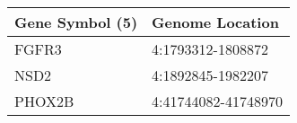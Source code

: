 \begin{tabular}{ll}
\toprule
Gene Symbol (5) &     Genome Location \\
\midrule
          FGFR3 &   4:1793312-1808872 \\
           NSD2 &   4:1892845-1982207 \\
         PHOX2B & 4:41744082-41748970 \\
\bottomrule
\end{tabular}
